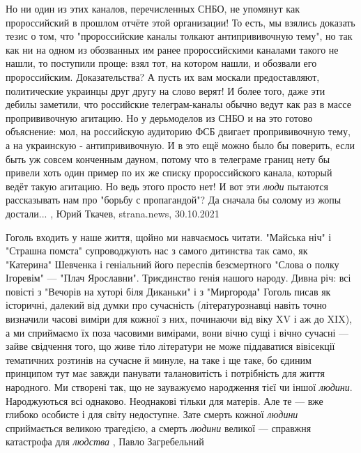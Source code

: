 Но ни один из этих каналов, перечисленных СНБО, не упомянут как пророссийский в
прошлом отчёте этой организации! То есть, мы взялись доказать тезис о том, что
"пророссийские каналы толкают антипрививочную тему", но так как ни на одном из
обозванных им ранее пророссийскими каналами такого не нашли, то поступили
проще: взял тот, на котором нашли, и обозвали его пророссийским.
Доказательства? А пусть их вам москали предоставляют, политические украинцы
друг другу на слово верят!  И более того, даже эти дебилы заметили, что
российские телеграм-каналы обычно ведут как раз в массе пропрививочную
агитацию. Но у дерьмоделов из СНБО и на это готово объяснение: мол, на
российскую аудиторию ФСБ двигает пропрививочную тему, а на украинскую -
антипрививочную. И в это ещё можно было бы поверить, если быть уж совсем
конченным дауном, потому что в телеграме границ нету бы привели хоть один
пример по их же списку пророссийского канала, который ведёт такую агитацию. Но
ведь этого просто нет!  И вот эти \emph{люди} пытаются рассказывать нам про
"борьбу с пропагандой"? Да сначала бы солому из жопы достали...
, 
Юрий Ткачев, strana.news, 30.10.2021

Гоголь входить у наше життя, щойно ми навчаємось читати. "Майська ніч" і
"Страшна помста" супроводжують нас з самого дитинства так само, як "Катерина"
Шевченка і геніальний його переспів безсмертного "Слова о полку Ігоревім" —
"Плач Ярославни". Триєдинство генія нашого народу.  Дивна річ: всі повісті з
"Вечорів на хуторі біля Диканьки" і з "Миргорода" Гоголь писав як історичні,
далекий від думки про сучасність (літературознавці навіть точно визначили
часові виміри для кожної з них, починаючи від віку XV і аж до XIX), а ми
сприймаємо їх поза часовими вимірами, вони вічно сущі і вічно сучасні — зайве
свідчення того, що живе тіло літератури не може піддаватися вівісекції
тематичних розтинів на сучасне й минуле, на таке і ще таке, бо єдиним принципом
тут має завжди панувати талановитість і потрібність для життя народного.  Ми
створені так, що не зауважуємо народження тієї чи іншої \emph{людини}.
Народжуються всі однаково. Неоднакові тільки для матерів. Але те — вже глибоко
особисте і для світу недоступне.  Зате смерть кожної \emph{людини} сприймається
великою трагедією, а смерть \emph{людини} великої — справжня катастрофа для
\emph{людства}
, Павло Загребельний


